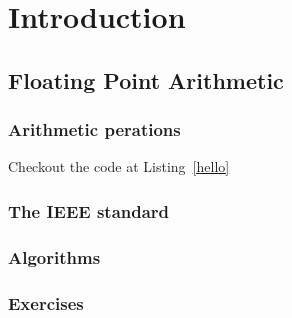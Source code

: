 \chapter{Introduction}\label{chp:introduction}

\section{Floating Point Arithmetic}\label{sec:floating-point-arithmetic}



\subsection{Arithmetic perations}

Checkout the code at Listing~\ref{hello}

\subsection{The IEEE standard}

\subsection{Algorithms}

\subsection{Exercises}
